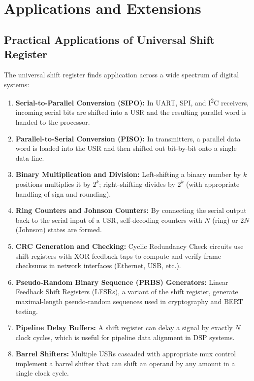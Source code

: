 \documentclass[12pt,a4paper]{report}
\begin{document}
\chapter{Applications and Extensions}

\section{Practical Applications of Universal Shift Register}

The universal shift register finds application across a wide spectrum of digital systems:

\begin{enumerate}[leftmargin=2.5em, label=\arabic*.]
    \item \textbf{Serial-to-Parallel Conversion (SIPO):} In UART, SPI, and I\textsuperscript{2}C receivers, incoming serial bits are shifted into a USR and the resulting parallel word is handed to the processor.
    \item \textbf{Parallel-to-Serial Conversion (PISO):} In transmitters, a parallel data word is loaded into the USR and then shifted out bit-by-bit onto a single data line.
    \item \textbf{Binary Multiplication and Division:} Left-shifting a binary number by $k$ positions multiplies it by $2^k$; right-shifting divides by $2^k$ (with appropriate handling of sign and rounding).
    \item \textbf{Ring Counters and Johnson Counters:} By connecting the serial output back to the serial input of a USR, self-decoding counters with $N$ (ring) or $2N$ (Johnson) states are formed.
    \item \textbf{CRC Generation and Checking:} Cyclic Redundancy Check circuits use shift registers with XOR feedback taps to compute and verify frame checksums in network interfaces (Ethernet, USB, etc.).
    \item \textbf{Pseudo-Random Binary Sequence (PRBS) Generators:} Linear Feedback Shift Registers (LFSRs), a variant of the shift register, generate maximal-length pseudo-random sequences used in cryptography and BERT testing.
    \item \textbf{Pipeline Delay Buffers:} A shift register can delay a signal by exactly $N$ clock cycles, which is useful for pipeline data alignment in DSP systems.
    \item \textbf{Barrel Shifters:} Multiple USRs cascaded with appropriate mux control implement a barrel shifter that can shift an operand by any amount in a single clock cycle.
\end{enumerate}
\end{document}

